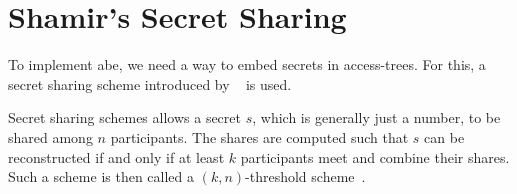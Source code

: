 





\section{Shamir's Secret Sharing}
To implement \acrshort{abe}, we need a way to embed secrets in \glspl{access-tree}.
For this, a secret sharing scheme introduced by \citeauthor{shamir_how_1979}~\cite{shamir_how_1979} is used.

Secret sharing schemes allows a secret $s$, which is generally just a number, to be shared among $n$ participants.
The shares are computed such that $s$ can be reconstructed if and only if at least $k$ participants meet and combine their shares.
Such a scheme is then called a $(k,n)$-threshold scheme~\cite{shamir_how_1979}.

